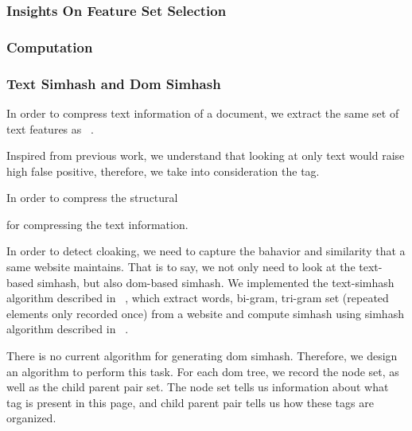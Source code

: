 \subsubsection{Insights On Feature Set Selection}



\subsubsection{Computation}


\subsubsection{Text Simhash and Dom Simhash}


In order to compress text information of a document, we extract the same set of
text features as ~\cite{manku2007detecting}.

Inspired from previous work, we understand that looking at only text would raise
high false positive, therefore, we take into consideration the tag.

In order to compress the structural 

for compressing
the text information. 



In order to detect cloaking, we need to capture the bahavior and similarity that
a same website maintains. That is to say, we not only need to look at the text-based simhash,
but also dom-based simhash. We implemented the text-simhash algorithm described
in ~\cite{manku2007detecting}, which extract words, bi-gram, tri-gram set
(repeated elements only recorded once) from a website and compute simhash using
simhash algorithm described in ~\cite{charikar2002similarity}.

There is no current algorithm for generating dom simhash. Therefore, we design
an algorithm to perform this task. For each dom tree, we record the node set, as
well as the child parent pair set. The node set tells us information about what
tag is present in this page, and child parent pair tells us how these tags are
organized.


